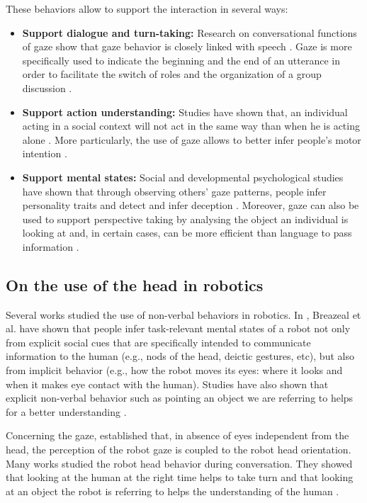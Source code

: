 \documentclass[english,a4paper,11pt,twoside]{StyleThese}
\begin{document}
These behaviors allow to support the interaction in several ways:
\begin{itemize}
\item \textbf{Support dialogue and turn-taking:} Research on conversational functions of gaze show that gaze behavior is closely linked with speech \cite{argyle1976gaze}. Gaze is more specifically used to indicate the beginning and the end of an utterance in order to facilitate the switch of roles \cite{kendon1967some} and the organization of a group discussion \cite{goffman1979footing}.
\item \textbf{Support action understanding:} Studies have shown that, an individual acting in a social context will not act in the same way than when he is acting alone \cite{becchio2010toward, vesper2010minimal}. More particularly, the use of gaze allows to better infer people's motor intention \cite{castiello2003understanding, pierno2006gaze}.
\item \textbf{Support mental states:} Social and developmental psychological studies have shown that through observing others’ gaze patterns, people infer personality traits \cite{kleinke1986gaze} and detect and infer deception \cite{hemsley1978effect}. Moreover, gaze can also be used to support perspective taking by analysing the object an individual is looking at \cite{furlanetto2013through} and, in certain cases, can be more efficient than language to pass information \cite{neider2010coordinating}.
\end{itemize}


\subsection{On the use of the head in robotics}

Several works studied the use of non-verbal behaviors in robotics. In \cite{breazeal2005effects}, Breazeal et al. have shown that people infer task-relevant mental states of a robot not only from explicit social cues that are specifically intended to communicate information to the human (e.g., nods of the head, deictic gestures, etc), but also from implicit behavior (e.g., how the robot moves its eyes: where it looks and when it makes eye contact with the human). Studies have also shown that explicit non-verbal behavior such as pointing an object we are referring to helps for a better understanding \cite{haring2012studies, salem2011friendly}.

Concerning the gaze, \cite{imai2002robot} established that, in absence of eyes independent from the head, the perception of the robot gaze is coupled to the robot head orientation. Many works studied the robot head behavior during conversation. They showed that looking at the human at the right time helps to take turn \cite{boucher2010facilitative, skantze2014turn} and that looking at an object the robot is referring to helps the understanding of the human \cite{mutlu2009footing, staudte2011investigating}.
\end{document}
